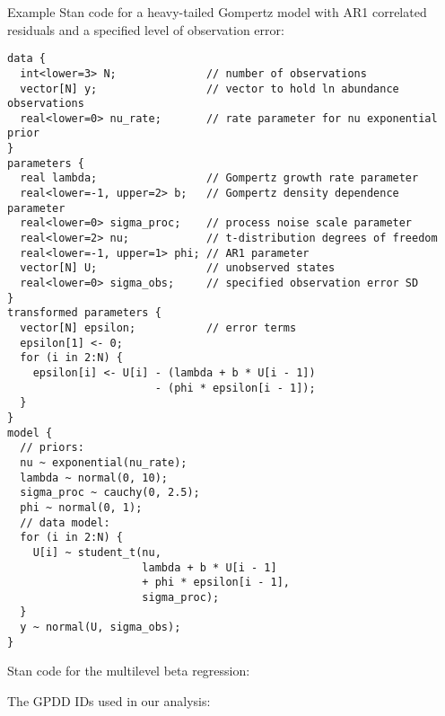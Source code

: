 %

\clearpage

\noindent
Example Stan code for a heavy-tailed Gompertz model with AR1 correlated residuals and a specified level of observation error:

\begin{spacing}{1.15}
\begin{footnotesize}
\begin{verbatim}
data {
  int<lower=3> N;              // number of observations
  vector[N] y;                 // vector to hold ln abundance observations
  real<lower=0> nu_rate;       // rate parameter for nu exponential prior
}
parameters {
  real lambda;                 // Gompertz growth rate parameter
  real<lower=-1, upper=2> b;   // Gompertz density dependence parameter
  real<lower=0> sigma_proc;    // process noise scale parameter
  real<lower=2> nu;            // t-distribution degrees of freedom
  real<lower=-1, upper=1> phi; // AR1 parameter
  vector[N] U;                 // unobserved states
  real<lower=0> sigma_obs;     // specified observation error SD
}
transformed parameters {
  vector[N] epsilon;           // error terms
  epsilon[1] <- 0;
  for (i in 2:N) {
    epsilon[i] <- U[i] - (lambda + b * U[i - 1])
                       - (phi * epsilon[i - 1]);
  }
}
model {
  // priors:
  nu ~ exponential(nu_rate);
  lambda ~ normal(0, 10);
  sigma_proc ~ cauchy(0, 2.5);
  phi ~ normal(0, 1);
  // data model:
  for (i in 2:N) {
    U[i] ~ student_t(nu,
                     lambda + b * U[i - 1]
                     + phi * epsilon[i - 1],
                     sigma_proc);
  }
  y ~ normal(U, sigma_obs);
}
\end{verbatim}
\end{footnotesize}

\clearpage
\noindent
Stan code for the multilevel beta regression:
\begin{footnotesize}

\end{footnotesize}

\clearpage

\noindent
The GPDD IDs used in our analysis:

\begin{footnotesize}
\noindent
{\tt

}
\end{footnotesize}
\end{spacing}
